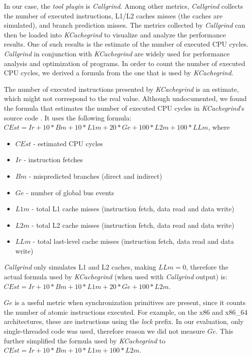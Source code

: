 \documentclass{llncs}
\begin{document}
In our case, the \textit{tool plugin} is \textit{Callgrind}. Among other metrics, \textit{Callgrind}
collects the number of executed instructions, L1/L2 caches misses (the caches are simulated), and branch
prediction misses. The metrics collected by \textit{Callgrind} can then be loaded into \textit{KCachegrind} 
to visualize and analyze the performance results. One of such results is the estimate of the number of executed CPU cycles.
\textit{Callgrind} in conjunction with \textit{KCachegrind} are widely used for performance analysis and optimization
of programs. In order to count the number of executed CPU cycles, we derived a formula from
the one that is used by \textit{KCachegrind}.

The number of executed instructions
presented by \textit{KCachegrind} is an estimate, which might not correspond to the real value.
Although undocumented, we found the formula that estimates the number of executed CPU cycles in
\textit{KCachegrind}'s source code \cite{cachegrind_source:online}.
It uses the
following formula: $CEst = Ir + 10*Bm + 10*L1m + 20*Ge + 100*L2m + 100*LLm$, where

\begin{itemize}
  \item $CEst$ - estimated CPU cycles
  \item $Ir$ - instruction fetches
  \item $Bm$ -  mispredicted branches (direct and indirect)
  \item $Ge$ - number of global bus events
  \item $L1m$ - total L1 cache misses (instruction fetch, data read and data write)
  \item $L2m$ - total L2 cache misses (instruction fetch, data read and data write)
  \item $LLm$ - total last-level cache misses (instruction fetch, data read and data write)
\end{itemize}

\textit{Callgrind} only simulates L1 and L2 caches, making $LLm=0$, therefore the actual formula
used by \textit{KCachegrind} (when used with \textit{Callgrind} output) is: 
$CEst = Ir + 10*Bm + 10*L1m + 20*Ge + 100*L2m$.

$Ge$ is a useful metric when synchronization primitives are present, since it counts the number of
atomic instructions executed. For example, on the x86 and x86\_64 architectures, these are
instructions using the \textit{lock} prefix. In our evaluation, only single-threaded code was used, therefore
reason we did not measure $Ge$. This further simplified the formula used by \textit{KCachegrind} to
$CEst = Ir + 10*Bm + 10*L1m + 100*L2m$.
\end{document}
